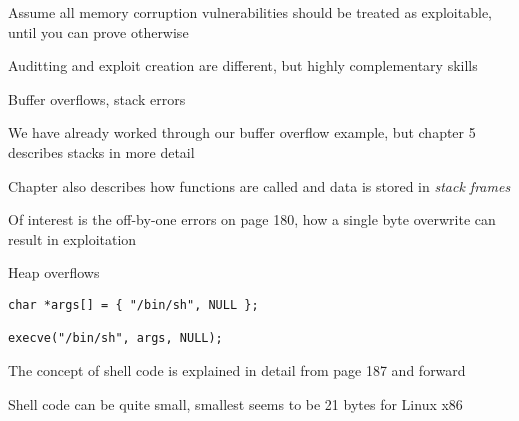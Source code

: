 \documentclass[Screen16to9,17pt]{foils}
\begin{document}




\begin{list2}
\item Assume all memory corruption vulnerabilities should be treated as exploitable, until you can prove otherwise
\item Auditting and exploit creation are different, but highly complementary skills
\end{list2}


\begin{list2}
\item Buffer overflows, stack errors
\item We have already worked through our buffer overflow example, but chapter 5 describes stacks in more detail
\item Chapter also describes how functions are called and data is stored in \emph{stack frames}
\item Of interest is the off-by-one errors on page 180, how a single byte overwrite can result in exploitation
\item Heap overflows
\end{list2}





\begin{verbatim}
char *args[] = { "/bin/sh", NULL };

execve("/bin/sh", args, NULL);
\end{verbatim}


\begin{list2}
\item The concept of shell code is explained in detail from page 187 and forward
\item Shell code can be quite small, smallest seems to be 21 bytes for Linux x86
\end{list2}
\end{document}
